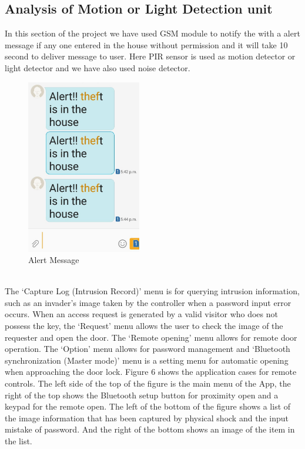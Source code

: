 \documentclass[twoside,a4paper,16pt]{book}
\begin{document}
{{			\subsection{Analysis of Motion or Light Detection unit}
			In this section of the project we have used GSM module to notify the with a alert message if any one entered in the house without permission and it will take 10 second to deliver message to user. Here PIR sensor is used as motion detector or light detector and we have also used noise detector. 
			\begin{figure}[ht!]
				\begin{center}
					\includegraphics[width=5.0cm]{p3.jpeg}
					\caption{Alert Message}
				\end{center}
			\end{figure}
			\\
			The ‘Capture Log (Intrusion Record)’ menu is for querying intrusion information, such as an invader’s image taken by the controller when a password input error occurs. When an access request is generated by a valid visitor who does not possess the key, the ‘Request’ menu allows the user to check the image of the requester and open the door. The ‘Remote opening’ menu allows for remote door operation. The ‘Option’ menu allows for password management and ‘Bluetooth synchronization (Master mode)’ menu is a setting menu for automatic opening when approaching the door lock. Figure 6 shows the application cases for remote controls. The left side of the top of the figure is the main menu of the App, the right of the top shows the Bluetooth setup button for proximity open and a keypad for the remote open. The left of the bottom of the figure shows a list of the image information that has been captured by physical shock and the input mistake of password. And the right of the bottom shows an image of the item in the list.
}}
\end{document}
